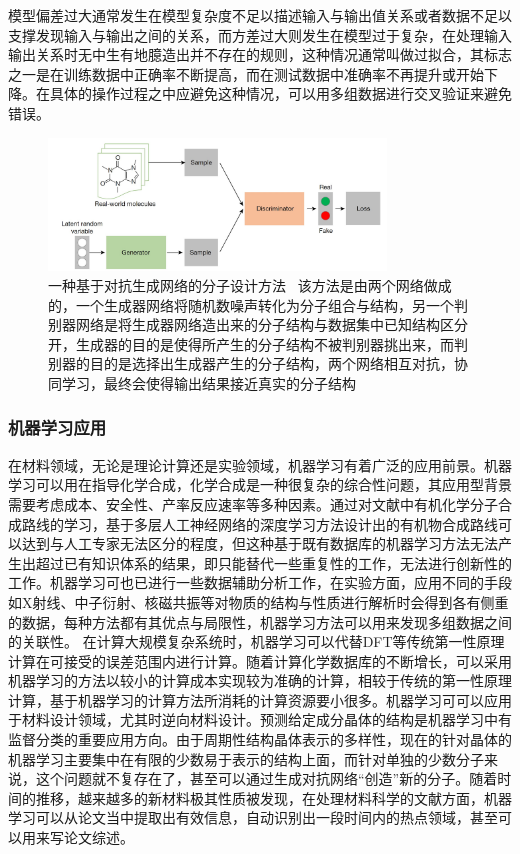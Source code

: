 模型偏差过大通常发生在模型复杂度不足以描述输入与输出值关系或者数据不足以支撑发现输入与输出之间的关系，而方差过大则发生在模型过于复杂，在处理输入输出关系时无中生有地臆造出并不存在的规则，这种情况通常叫做过拟合，其标志之一是在训练数据中正确率不断提高，而在测试数据中准确率不再提升或开始下降。在具体的操作过程之中应避免这种情况，可以用多组数据进行交叉验证来避免错误。

\begin{figure}[h]
    \centering
\includegraphics[width=0.8\textwidth]{./pic/026.png}
\caption{一种基于对抗生成网络的分子设计方法 \ 该方法是由两个网络做成的，一个生成器网络将随机数噪声转化为分子组合与结构，另一个判别器网络是将生成器网络造出来的分子结构与数据集中已知结构区分开，生成器的目的是使得所产生的分子结构不被判别器挑出来，而判别器的目的是选择出生成器产生的分子结构，两个网络相互对抗，协同学习，最终会使得输出结果接近真实的分子结构}

\label{dog024}
\end{figure}

\subsubsection{机器学习应用}

在材料领域，无论是理论计算还是实验领域，机器学习有着广泛的应用前景。机器学习可以用在指导化学合成，化学合成是一种很复杂的综合性问题，其应用型背景需要考虑成本、安全性、产率反应速率等多种因素。通过对文献中有机化学分子合成路线的学习，基于多层人工神经网络的深度学习方法设计出的有机物合成路线可以达到与人工专家无法区分的程度，但这种基于既有数据库的机器学习方法无法产生出超过已有知识体系的结果，即只能替代一些重复性的工作，无法进行创新性的工作。机器学习可也已进行一些数据辅助分析工作，在实验方面，应用不同的手段如X射线、中子衍射、核磁共振等对物质的结构与性质进行解析时会得到各有侧重的数据，每种方法都有其优点与局限性，机器学习方法可以用来发现多组数据之间的关联性。
在计算大规模复杂系统时，机器学习可以代替DFT等传统第一性原理计算在可接受的误差范围内进行计算。随着计算化学数据库的不断增长，可以采用机器学习的方法以较小的计算成本实现较为准确的计算，相较于传统的第一性原理计算，基于机器学习的计算方法所消耗的计算资源要小很多。机器学习可可以应用于材料设计领域，尤其时逆向材料设计。预测给定成分晶体的结构是机器学习中有监督分类的重要应用方向。由于周期性结构晶体表示的多样性，现在的针对晶体的机器学习主要集中在有限的少数易于表示的结构上面，而针对单独的少数分子来说，这个问题就不复存在了，甚至可以通过生成对抗网络“创造”新的分子。随着时间的推移，越来越多的新材料极其性质被发现，在处理材料科学的文献方面，机器学习可以从论文当中提取出有效信息，自动识别出一段时间内的热点领域，甚至可以用来写论文综述。








